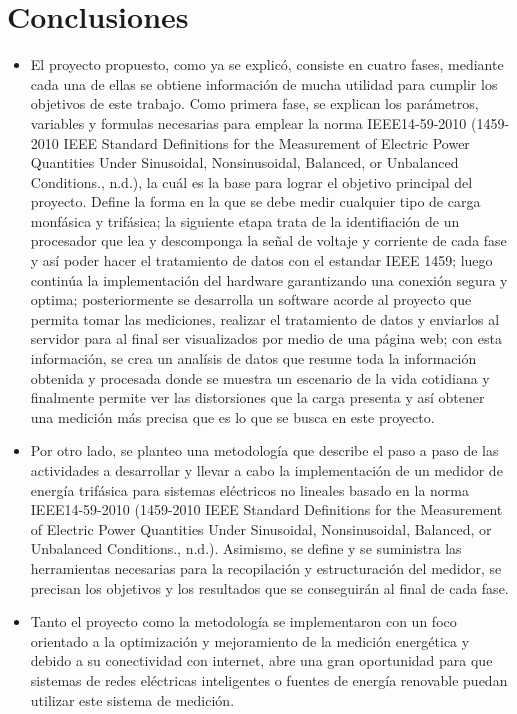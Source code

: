 {\clearpage}
\chapter{ Conclusiones}

\begin{itemize}
    \itemsep0em
    \item El proyecto propuesto, como ya se explicó, consiste en cuatro fases, mediante cada una de ellas se obtiene información de mucha utilidad para cumplir los objetivos de este trabajo. Como primera fase, se explican los parámetros, variables y formulas necesarias para emplear la norma IEEE14-59-2010 (1459-2010 IEEE Standard Definitions for the Measurement of Electric Power Quantities Under Sinusoidal, Nonsinusoidal, Balanced, or Unbalanced Conditions., n.d.), la cuál es la base para lograr el objetivo principal del proyecto. Define la forma en la que se debe medir cualquier tipo de carga monfásica y trifásica; la siguiente etapa trata de la identifiación de un procesador que lea y descomponga la señal de voltaje y corriente de cada fase y así poder hacer el tratamiento de datos con el estandar IEEE 1459; luego continúa la implementación del hardware garantizando una conexión segura y optima; posteriormente se desarrolla un software acorde al proyecto que permita tomar las mediciones, realizar el tratamiento de datos y enviarlos al servidor para al final ser visualizados por medio de una página web; con esta información, se crea un analísis de datos que resume toda la información obtenida y procesada donde se muestra un escenario de la vida cotidiana y finalmente permite ver las distorsiones que la carga presenta y así obtener una medición más precisa que es lo que se busca en este proyecto.
    \item Por otro lado, se planteo una metodología que describe el paso a paso de las actividades a desarrollar y llevar a cabo la implementación de un medidor de energía trifásica para sistemas eléctricos no lineales basado en la norma IEEE14-59-2010 (1459-2010 IEEE Standard Definitions for the Measurement of Electric Power Quantities Under Sinusoidal, Nonsinusoidal, Balanced, or Unbalanced Conditions., n.d.). Asimismo, se define y se suministra las herramientas necesarias para la recopilación y estructuración del medidor, se precisan los objetivos y los resultados que se conseguirán al final de cada fase.
    \item Tanto el proyecto como la metodología se implementaron con un foco orientado a la optimización y mejoramiento de la medición energética y debido a su conectividad con internet, abre una gran oportunidad para que sistemas de redes eléctricas inteligentes o fuentes de energía renovable puedan utilizar este sistema de medición.

\end{itemize}
